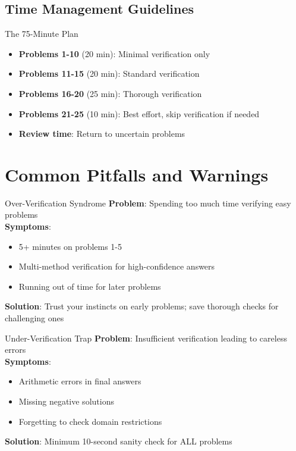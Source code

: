 \documentclass{article}
\begin{document}
\subsection{Time Management Guidelines}

\begin{strategybox}{The 75-Minute Plan}
\begin{itemize}[nosep]
\item \textbf{Problems 1-10} (20 min): Minimal verification only
\item \textbf{Problems 11-15} (20 min): Standard verification
\item \textbf{Problems 16-20} (25 min): Thorough verification
\item \textbf{Problems 21-25} (10 min): Best effort, skip verification if needed
\item \textbf{Review time}: Return to uncertain problems
\end{itemize}
\end{strategybox}

\newpage

\section{Common Pitfalls and Warnings}

\begin{warningbox}{Over-Verification Syndrome}
\textbf{Problem}: Spending too much time verifying easy problems\\
\textbf{Symptoms}: 
\begin{itemize}[nosep]
\item 5+ minutes on problems 1-5
\item Multi-method verification for high-confidence answers
\item Running out of time for later problems
\end{itemize}
\textbf{Solution}: Trust your instincts on early problems; save thorough checks for challenging ones
\end{warningbox}

\begin{warningbox}{Under-Verification Trap}
\textbf{Problem}: Insufficient verification leading to careless errors\\
\textbf{Symptoms}:
\begin{itemize}[nosep]
\item Arithmetic errors in final answers
\item Missing negative solutions
\item Forgetting to check domain restrictions
\end{itemize}
\textbf{Solution}: Minimum 10-second sanity check for ALL problems
\end{warningbox}
\end{document}
